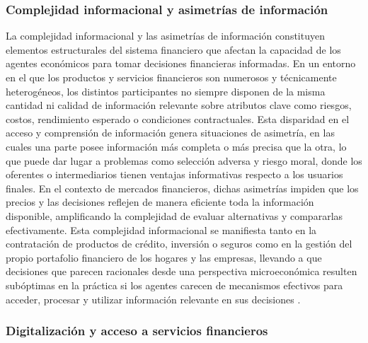 \documentclass[
	spanish, %
	letterpaper, oneside
]{book}
\begin{document}
\subsubsection{Complejidad informacional y asimetrías de información}

La complejidad informacional y las asimetrías de información constituyen elementos estructurales del sistema financiero que afectan la capacidad de los agentes económicos para tomar decisiones financieras informadas. En un entorno en el que los productos y servicios financieros son numerosos y técnicamente heterogéneos, los distintos participantes no siempre disponen de la misma cantidad ni calidad de información relevante sobre atributos clave como riesgos, costos, rendimiento esperado o condiciones contractuales. Esta disparidad en el acceso y comprensión de información genera situaciones de asimetría, en las cuales una parte posee información más completa o más precisa que la otra, lo que puede dar lugar a problemas como selección adversa y riesgo moral, donde los oferentes o intermediarios tienen ventajas informativas respecto a los usuarios finales. En el contexto de mercados financieros, dichas asimetrías impiden que los precios y las decisiones reflejen de manera eficiente toda la información disponible, amplificando la complejidad de evaluar alternativas y compararlas efectivamente. Esta complejidad informacional se manifiesta tanto en la contratación de productos de crédito, inversión o seguros como en la gestión del propio portafolio financiero de los hogares y las empresas, llevando a que decisiones que parecen racionales desde una perspectiva microeconómica resulten subóptimas en la práctica si los agentes carecen de mecanismos efectivos para acceder, procesar y utilizar información relevante en sus decisiones \cite{info_asymmetry_sciencedirect}.


\subsubsection{Digitalización y acceso a servicios financieros}
\end{document}
